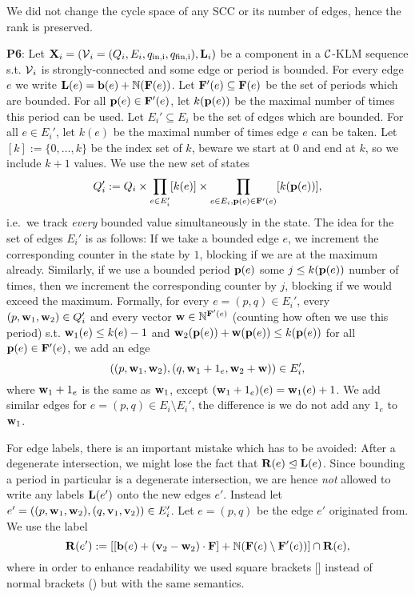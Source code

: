 We did not change the cycle space of any SCC or its number of edges, hence the rank is preserved.

\textbf{P6}: Let \(\mathbf{X}_i=(\operatorname{\mathcal{V}}_i=(Q_i, E_i, q_{\text{in,i}}, q_{\text{fin,i}}), \mathbf{L}_i)\) be a component in a \(\mathcal{C}\)-KLM sequence s.t. \(\operatorname{\mathcal{V}}_i\) is strongly-connected and some edge or period is bounded. For every edge \(e\) we write \(\mathbf{L}(e)=\mathbf{b}(e)+\mathbb{N}(\mathbf{F}(e))\). Let \(\mathbf{F}'(e) \subseteq \mathbf{F}(e)\) be the set of periods which are bounded. For all \(\mathbf{p}(e) \in \mathbf{F}'(e)\), let \(k(\mathbf{p}(e))\) be the maximal number of times this period can be used. Let \(E_i' \subseteq E_i\) be the set of edges which are bounded. For all \(e \in E_i'\), let \(k(e)\) be the maximal number of times edge \(e\) can be taken. Let \([k]:=\{0, \dots, k\}\) be the index set of \(k\), beware we start at \(0\) and end at \(k\), so we include \(k+1\) values. We use the new set of states 
\[Q_i':=Q_i \times \prod_{e \in E_i'} [k(e)] \times \prod_{e \in E_i, \mathbf{p}(e) \in \mathbf{F}'(e)} [k(\mathbf{p}(e))],\]
i.e.\ we track \emph{every} bounded value simultaneously in the state. The idea for the set of edges \(E_i'\) is as follows: If we take a bounded edge \(e\), we increment the corresponding counter in the state by \(1\), blocking if we are at the maximum already. Similarly, if we use a bounded period \(\mathbf{p}(e)\) some \(j \leq k(\mathbf{p}(e))\) number of times, then we increment the corresponding counter by \(j\), blocking if we would exceed the maximum. Formally, for every \(e=(p,q) \in E_i'\), every \((p, \mathbf{w}_1, \mathbf{w}_2) \in Q_i'\) and every vector \(\mathbf{w} \in \mathbb{N}^{\mathbf{F}'(e)}\) (counting how often we use this period) s.t. \(\mathbf{w}_1(e)\leq k(e)-1\) and \(\mathbf{w}_2(\mathbf{p}(e))+\mathbf{w}(\mathbf{p}(e))\leq k(\mathbf{p}(e))\) for all \(\mathbf{p}(e) \in \mathbf{F}'(e)\), we add an edge 
\[((p, \mathbf{w}_1, \mathbf{w}_2), (q, \mathbf{w}_1+1_e, \mathbf{w}_2+\mathbf{w})) \in E_i',\]
where \(\mathbf{w}_1+1_e\) is the same as \(\mathbf{w}_1\), except \((\mathbf{w}_1+1_e)(e)=\mathbf{w}_1(e)+1\). We add similar edges for \(e=(p,q) \in E_i \setminus E_i'\), the difference is we do not add any \(1_e\) to \(\mathbf{w}_1\).

For edge labels, there is an important mistake which has to be avoided: After a degenerate intersection, we might lose the fact that \(\mathbf{R}(e) \trianglelefteq \mathbf{L}(e)\). Since bounding a period in particular is a degenerate intersection, we are hence \emph{not} allowed to write any labels \(\mathbf{L}(e')\) onto the new edges \(e'\). Instead let \(e'=((p, \mathbf{w}_1, \mathbf{w}_2), (q, \mathbf{v}_1, \mathbf{v}_2)) \in E_i'\). Let \(e=(p,q)\) be the edge \(e'\) originated from. We use the label 
\[\mathbf{R}(e'):=[[\mathbf{b}(e)+(\mathbf{v}_2-\mathbf{w}_2) \cdot \mathbf{F}]+\mathbb{N}(\mathbf{F}(e) \setminus \mathbf{F}'(e))] \cap \mathbf{R}(e),\]
where in order to enhance readability we used square brackets [] instead of normal brackets () but with the same semantics.

